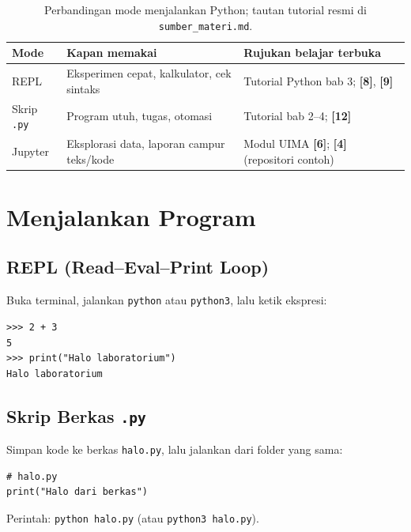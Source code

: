 \documentclass[../main.tex]{subfiles}
\begin{document}
\begin{table}[htbp]
\centering
\begin{tabular}{|l|>{\raggedright\arraybackslash}p{4.2cm}|>{\raggedright\arraybackslash}p{5.8cm}|}
\hline
\textbf{Mode} & \textbf{Kapan memakai} & \textbf{Rujukan belajar terbuka} \\
\hline
REPL & Eksperimen cepat, kalkulator, cek sintaks & Tutorial Python bab 3; \textbf{[8]}, \textbf{[9]} \\
\hline
Skrip \texttt{.py} & Program utuh, tugas, otomasi & Tutorial bab 2--4; \textbf{[12]} \\
\hline
Jupyter & Eksplorasi data, laporan campur teks/kode & Modul UIMA \textbf{[6]}; \textbf{[4]} (repositori contoh) \\
\hline
\end{tabular}
\caption[Perbandingan mode menjalankan Python]{Perbandingan mode menjalankan Python; tautan tutorial resmi di \texttt{sumber\_materi.md}.}
\label{tab:mode-jalankan}
\end{table}

\section{Menjalankan Program}

\subsection{REPL (Read--Eval--Print Loop)}

Buka terminal, jalankan \texttt{python} atau \texttt{python3}, lalu ketik ekspresi:

\begin{lstlisting}[caption=Contoh sesi REPL]
>>> 2 + 3
5
>>> print("Halo laboratorium")
Halo laboratorium
\end{lstlisting}

\subsection{Skrip Berkas \texttt{.py}}

Simpan kode ke berkas \texttt{halo.py}, lalu jalankan dari folder yang sama:

\begin{lstlisting}[caption=Skrip sederhana]
# halo.py
print("Halo dari berkas")
\end{lstlisting}

Perintah: \texttt{python halo.py} (atau \texttt{python3 halo.py}).
\end{document}
